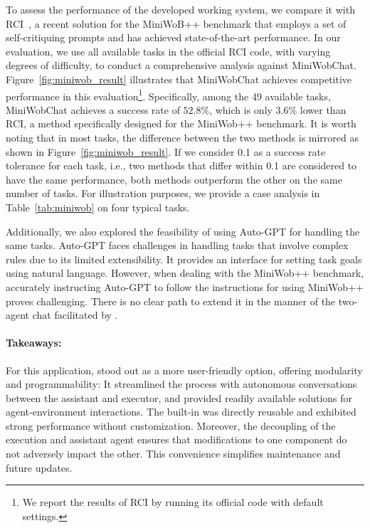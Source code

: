 To assess the performance of the developed working system, we compare it with RCI~\cite{kim2023language}, a recent solution for the MiniWoB++ benchmark that employs a set of self-critiquing prompts and has achieved state-of-the-art performance.
In our evaluation, we use all available tasks in the official RCI code, with varying degrees of difficulty, to conduct a comprehensive analysis against MiniWobChat. Figure~\ref{fig:miniwob_result} illustrates that MiniWobChat achieves competitive performance in this evaluation\footnote{We report the results of RCI by running its official code with default settings.}. Specifically, among the 49 available tasks, MiniWobChat achieves a success rate of $52.8\%$, which is only $3.6\%$ lower than RCI, a method specifically designed for the MiniWob++ benchmark. It is worth noting that in most tasks, the difference between the two methods is mirrored as shown in Figure~\ref{fig:miniwob_result}. If we consider 0.1 as a success rate tolerance for each task, i.e., two methods that differ within 0.1 are considered to have the same performance, both methods outperform the other on the same number of tasks. For illustration purposes, we provide a case analysis in Table~\ref{tab:miniwob} on four typical tasks.


Additionally, we also explored the feasibility of using Auto-GPT for handling the same tasks.
Auto-GPT faces challenges in handling tasks that involve complex rules due to its limited extensibility. It provides an interface for setting task goals using natural language. However, when dealing with the MiniWob++ benchmark, accurately instructing Auto-GPT to follow the instructions for using MiniWob++ proves challenging. There is no clear path to extend it in the manner of the two-agent chat facilitated by \libName.

\paragraph{Takeaways:} For this application, \libName stood out as a more user-friendly option, offering modularity and programmability:
It streamlined the process with autonomous conversations between the assistant and executor, and provided readily available solutions for agent-environment interactions. The built-in \AssistantAgent was directly reusable and exhibited strong performance without customization.
Moreover, the decoupling of the execution and assistant agent ensures that modifications to one component do not adversely impact the other. This convenience simplifies maintenance and future updates.


